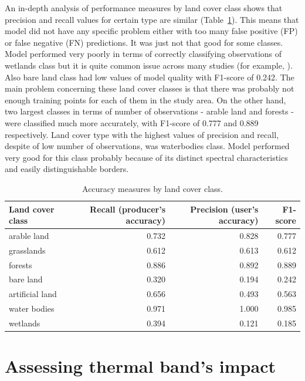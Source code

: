 \documentclass{amuthesis}
\begin{document}
An in-depth analysis of performance measures by land cover class shows
that precision and recall values for certain type are similar
(Table~\ref{tbl-tabela5}). This means that model did not have any
specific problem either with too many false positive (FP) or false
negative (FN) predictions. It was just not that good for some classes.
Model performed very poorly in terms of correctly classifying
observations of wetlands class but it is quite common issue across many
studies (for example, \textcite{malinowski_automated_2020}). Also bare
land class had low values of model quality with F1-score of 0.242. The
main problem concerning these land cover classes is that there was
probably not enough training points for each of them in the study area.
On the other hand, two largest classes in terms of number of
observations - arable land and forests - were classified much more
accurately, with F1-score of 0.777 and 0.889 respectively. Land cover
type with the highest values of precision and recall, despite of low
number of observations, was waterbodies class. Model performed very good
for this class probably because of its distinct spectral characteristics
and easily distinguishable borders.

\hypertarget{tbl-tabela5}{}
\begin{table}
\caption{\label{tbl-tabela5}Accuracy measures by land cover class. }\tabularnewline

\centering
\begin{tabular}{|>{}l|>{}r|>{}r|>{}r|}
\toprule
\textbf{Land cover class} & \textbf{Recall (producer's accuracy)} & \textbf{Precision (user's accuracy)} & \textbf{F1-score}\\
\midrule
arable land & 0.732 & 0.828 & 0.777\\
\hline
grasslands & 0.612 & 0.613 & 0.612\\
\hline
forests & 0.886 & 0.892 & 0.889\\
\hline
bare land & 0.320 & 0.194 & 0.242\\
\hline
artificial land & 0.656 & 0.493 & 0.563\\
\hline
water bodies & 0.971 & 1.000 & 0.985\\
\hline
wetlands & 0.394 & 0.121 & 0.185\\
\bottomrule
\end{tabular}
\end{table}


\hypertarget{sec-results-therm}{%
\chapter{Assessing thermal band's impact}\label{sec-results-therm}}
\end{document}
